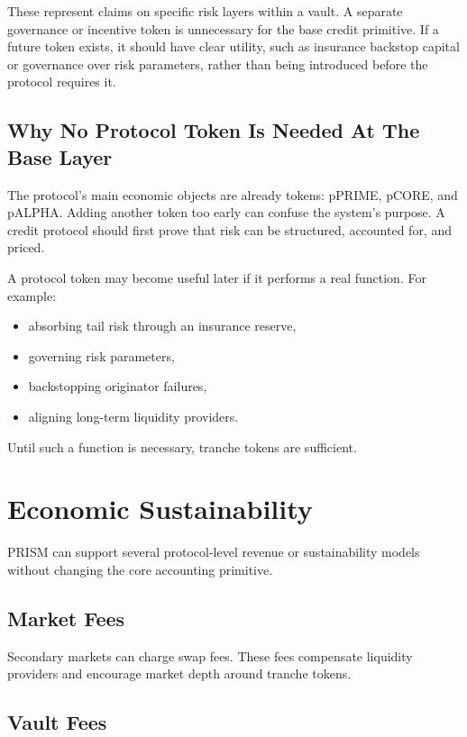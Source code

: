 \documentclass[11pt]{article}
\begin{document}
These represent claims on specific risk layers within a vault. A separate
governance or incentive token is unnecessary for the base credit primitive. If a
future token exists, it should have clear utility, such as insurance backstop
capital or governance over risk parameters, rather than being introduced before
the protocol requires it.

\subsection{Why No Protocol Token Is Needed At The Base Layer}

The protocol's main economic objects are already tokens: pPRIME, pCORE, and
pALPHA. Adding another token too early can confuse the system's purpose. A
credit protocol should first prove that risk can be structured, accounted for,
and priced.

A protocol token may become useful later if it performs a real function. For
example:

\begin{itemize}
  \item absorbing tail risk through an insurance reserve,
  \item governing risk parameters,
  \item backstopping originator failures,
  \item aligning long-term liquidity providers.
\end{itemize}

Until such a function is necessary, tranche tokens are sufficient.

\section{Economic Sustainability}

PRISM can support several protocol-level revenue or sustainability models
without changing the core accounting primitive.

\subsection{Market Fees}

Secondary markets can charge swap fees. These fees compensate liquidity
providers and encourage market depth around tranche tokens.

\subsection{Vault Fees}
\end{document}
